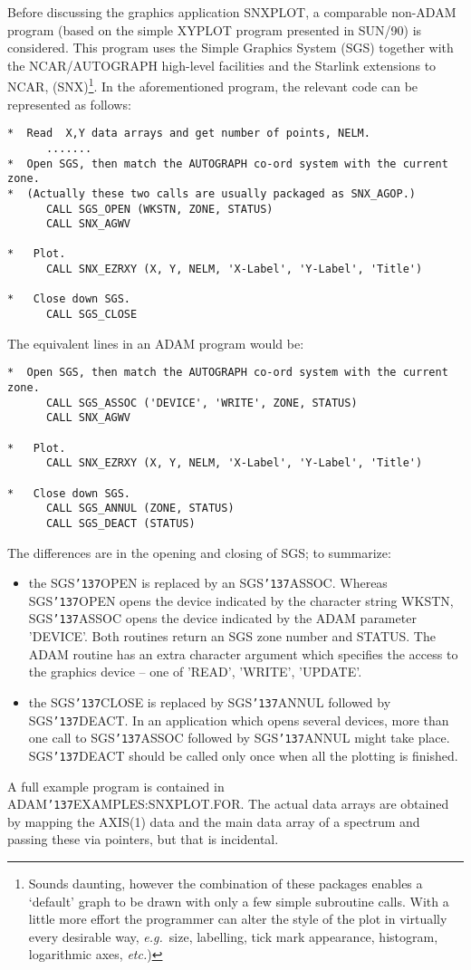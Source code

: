 \documentclass[twoside,11pt]{article}
\renewcommand{\_}{{\tt\char'137}}
\newcommand{\xref}[3]{#1}
\begin{document}
Before discussing the graphics application SNXPLOT, 
a comparable non-ADAM program
(based on the simple XYPLOT program presented in 
\xref{SUN/90}{sun90}{}) is considered. 
This program uses the Simple Graphics System (SGS) together with the 
NCAR/AUTOGRAPH high-level facilities and the Starlink extensions to NCAR, 
(SNX)\footnote{Sounds daunting, however the combination of these packages 
enables a `default' graph to be drawn with only a few simple subroutine calls.
With a little more effort the programmer can alter  the style of the plot 
in virtually every desirable way,
{\it e.g.}\ size, labelling, tick mark appearance, histogram, logarithmic 
axes,  {\it etc.})}.
In the aforementioned program, the relevant code can be
represented as follows:
\begin{verbatim}
*  Read  X,Y data arrays and get number of points, NELM.
      .......
*  Open SGS, then match the AUTOGRAPH co-ord system with the current zone.
*  (Actually these two calls are usually packaged as SNX_AGOP.)
      CALL SGS_OPEN (WKSTN, ZONE, STATUS)
      CALL SNX_AGWV

*   Plot.
      CALL SNX_EZRXY (X, Y, NELM, 'X-Label', 'Y-Label', 'Title')

*   Close down SGS.
      CALL SGS_CLOSE
\end{verbatim}
The equivalent lines in an ADAM program would be:
\begin{verbatim}
*  Open SGS, then match the AUTOGRAPH co-ord system with the current zone.
      CALL SGS_ASSOC ('DEVICE', 'WRITE', ZONE, STATUS)      
      CALL SNX_AGWV

*   Plot.
      CALL SNX_EZRXY (X, Y, NELM, 'X-Label', 'Y-Label', 'Title')

*   Close down SGS.
      CALL SGS_ANNUL (ZONE, STATUS)
      CALL SGS_DEACT (STATUS)
\end{verbatim}
The differences are in the opening and closing of SGS; to summarize:
\begin{itemize}
\item the SGS\_OPEN is replaced by an SGS\_ASSOC.
Whereas SGS\_OPEN opens the device indicated by the character string WKSTN,
SGS\_ASSOC opens the device indicated by the ADAM parameter 'DEVICE'.
Both routines return an SGS zone number and STATUS. The ADAM routine has an 
extra character argument which specifies the access to the graphics device 
-- one of 'READ', 'WRITE', 'UPDATE'.
\item the SGS\_CLOSE is replaced by SGS\_ANNUL followed by SGS\_DEACT.
In an application which opens several devices, more than 
one call to SGS\_ASSOC followed by SGS\_ANNUL might take place.
SGS\_DEACT should be called only once when all the
plotting is finished.
\end{itemize}
A full example program is contained in ADAM\_EXAMPLES:SNXPLOT.FOR.
The actual data arrays are obtained by mapping the AXIS(1) data and the 
main data array of a spectrum and passing these via  pointers,
but that is incidental.
\end{document}
